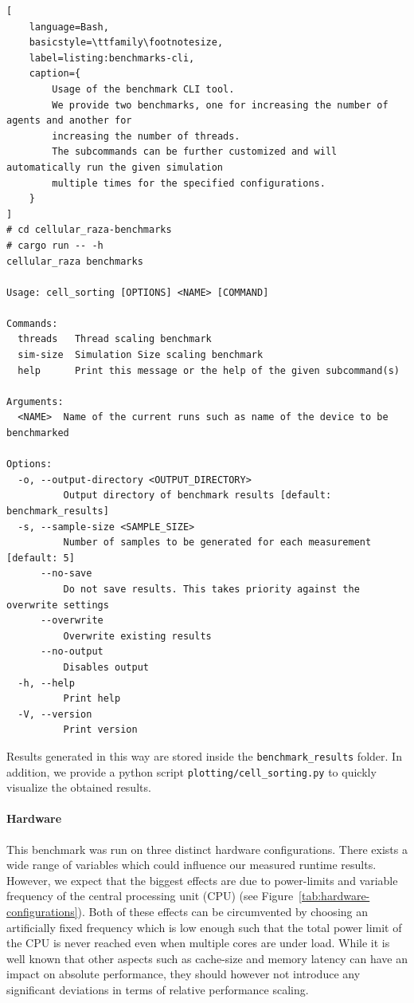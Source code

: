 \documentclass[fontsize=11pt,a4paper]{article}
\begin{document}
\begin{minipage}{\linewidth}\begin{lstlisting}[
    language=Bash,
    basicstyle=\ttfamily\footnotesize,
    label=listing:benchmarks-cli,
    caption={
        Usage of the benchmark CLI tool.
        We provide two benchmarks, one for increasing the number of agents and another for
        increasing the number of threads.
        The subcommands can be further customized and will automatically run the given simulation
        multiple times for the specified configurations.
    }
]
# cd cellular_raza-benchmarks
# cargo run -- -h
cellular_raza benchmarks

Usage: cell_sorting [OPTIONS] <NAME> [COMMAND]

Commands:
  threads   Thread scaling benchmark
  sim-size  Simulation Size scaling benchmark
  help      Print this message or the help of the given subcommand(s)

Arguments:
  <NAME>  Name of the current runs such as name of the device to be benchmarked

Options:
  -o, --output-directory <OUTPUT_DIRECTORY>
          Output directory of benchmark results [default: benchmark_results]
  -s, --sample-size <SAMPLE_SIZE>
          Number of samples to be generated for each measurement [default: 5]
      --no-save
          Do not save results. This takes priority against the overwrite settings
      --overwrite
          Overwrite existing results
      --no-output
          Disables output
  -h, --help
          Print help
  -V, --version
          Print version
\end{lstlisting}\end{minipage}

Results generated in this way are stored inside the \texttt{benchmark\_results} folder.
In addition, we provide a python script \texttt{plotting/cell\_sorting.py} to quickly visualize
the obtained results.

\paragraph{Hardware}
This benchmark was run on three distinct hardware configurations.
There exists a wide range of variables which could influence our measured runtime results.
However, we expect that the biggest effects are due to power-limits and variable frequency of the
central processing unit (CPU) (see Figure~\ref{tab:hardware-configurations}).
Both of these effects can be circumvented by choosing an artificially fixed frequency which is low
enough such that the total power limit of the CPU is never reached even when multiple cores are
under load.
While it is well known that other aspects such as cache-size and memory latency can have an impact
on absolute performance, they should however not introduce any significant deviations in terms of
relative performance scaling.
\end{document}

